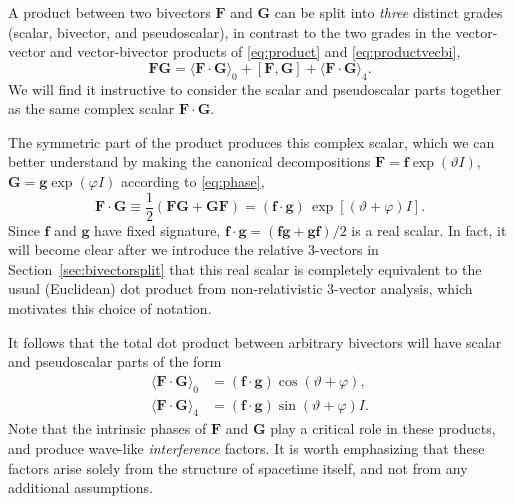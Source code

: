 \documentclass[1p,sort&compress]{elsarticle}
\numberwithin{equation}{section}
\newcommand{\bv}[1]{\mathbf{#1}}
\newcommand{\mean}[1]{\langle #1 \rangle}
\begin{document}

A product between two bivectors $\bv{F}$ and $\bv{G}$ can be split into \emph{three} distinct grades (scalar, bivector, and pseudoscalar), in contrast to the two grades in the vector-vector and vector-bivector products of \eqref{eq:product} and \eqref{eq:productvecbi},
\begin{equation}
  \bv{F}\bv{G} = \mean{\bv{F}\cdot \bv{G}}_0 + [\bv{F},\bv{G}] + \mean{\bv{F} \cdot \bv{G}}_4.
\end{equation}
We will find it instructive to consider the scalar and pseudoscalar parts together as the same complex scalar $\bv{F}\cdot \bv{G}$.

The symmetric part of the product produces this complex scalar, which we can better understand by making the canonical decompositions $\bv{F} = \bv{f}\exp(\vartheta I)$, $\bv{G} = \bv{g}\exp(\varphi I)$ according to \eqref{eq:phase},  
\begin{equation}
  \bv{F}\cdot \bv{G} \equiv \frac{1}{2}(\bv{FG} + \bv{GF}) = (\bv{f}\cdot \bv{g})\, \exp[(\vartheta + \varphi)I].
\end{equation}
Since $\bv{f}$ and $\bv{g}$ have fixed signature, $\bv{f}\cdot \bv{g} = (\bv{fg} + \bv{gf})/2$ is a real scalar.  In fact, it will become clear after we introduce the relative 3-vectors in Section~\ref{sec:bivectorsplit} that this real scalar is completely equivalent to the usual (Euclidean) dot product from non-relativistic 3-vector analysis, which motivates this choice of notation.

It follows that the total dot product between arbitrary bivectors will have scalar and pseudoscalar parts of the form
\begin{align}
  \mean{\bv{F}\cdot \bv{G}}_0 &= (\bv{f}\cdot \bv{g}) \cos(\vartheta + \varphi), \\
  \mean{\bv{F}\cdot \bv{G}}_4 &= (\bv{f}\cdot \bv{g}) \sin(\vartheta + \varphi) I.
\end{align}
Note that the intrinsic phases of $\bv{F}$ and $\bv{G}$ play a critical role in these products, and produce wave-like \emph{interference} factors.  It is worth emphasizing that these factors arise solely from the structure of spacetime itself, and not from any additional assumptions.
\end{document}
